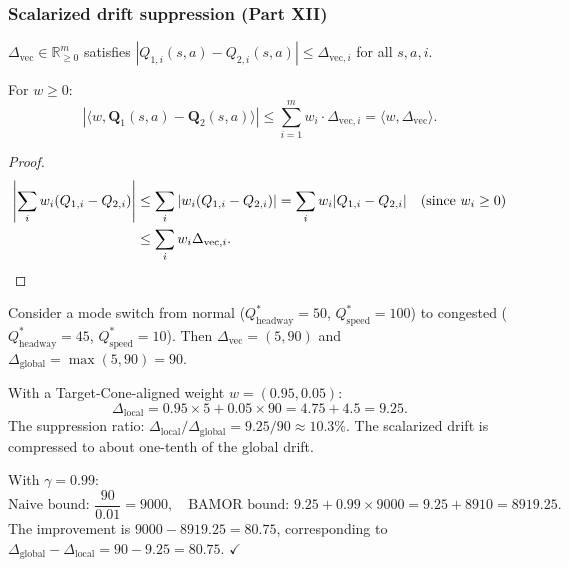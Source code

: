 \subsubsection{Scalarized drift suppression (Part XII)}

\begin{definition}
$\Delta_{\mathrm{vec}} \in \mathbb{R}^m_{\ge 0}$ satisfies $|Q_{1,i}(s,a) - Q_{2,i}(s,a)| \le \Delta_{\mathrm{vec},i}$ for all $s,a,i$.
\end{definition}

\begin{lemma}
\label{lem:drift_suppression}
For $w \ge 0$:
\begin{equation}
    |\langle w, \mathbf{Q}_1(s,a) - \mathbf{Q}_2(s,a) \rangle| \le \sum_{i=1}^m w_i \cdot \Delta_{\mathrm{vec},i} = \langle w, \Delta_{\mathrm{vec}} \rangle.
\end{equation}
\end{lemma}

\begin{proof}
\begin{align}
    \left|\sum_i w_i(Q_{1,i} - Q_{2,i})\right| &\le \sum_i |w_i(Q_{1,i} - Q_{2,i})| = \sum_i w_i |Q_{1,i} - Q_{2,i}| \quad (\text{since } w_i \ge 0) \\
    &\le \sum_i w_i \Delta_{\mathrm{vec},i}. \qedhere
\end{align}
\end{proof}

\begin{example}
\label{ex:drift}
Consider a mode switch from normal ($Q^*_{\mathrm{headway}} = 50$, $Q^*_{\mathrm{speed}} = 100$) to congested ($Q^*_{\mathrm{headway}} = 45$, $Q^*_{\mathrm{speed}} = 10$).  Then $\Delta_{\mathrm{vec}} = (5, 90)$ and $\Delta_{\mathrm{global}} = \max(5, 90) = 90$.

With a Target-Cone-aligned weight $w = (0.95, 0.05)$:
\begin{equation}
    \Delta_{\mathrm{local}} = 0.95 \times 5 + 0.05 \times 90 = 4.75 + 4.5 = 9.25.
\end{equation}
The suppression ratio: $\Delta_{\mathrm{local}} / \Delta_{\mathrm{global}} = 9.25 / 90 \approx 10.3\%$.  The scalarized drift is compressed to about one-tenth of the global drift.

With $\gamma = 0.99$:
\begin{equation}
    \text{Naive bound: } \frac{90}{0.01} = 9000, \quad \text{BAMOR bound: } 9.25 + 0.99 \times 9000 = 9.25 + 8910 = 8919.25.
\end{equation}
The improvement is $9000 - 8919.25 = 80.75$, corresponding to $\Delta_{\mathrm{global}} - \Delta_{\mathrm{local}} = 90 - 9.25 = 80.75$.  $\checkmark$
\end{example}

